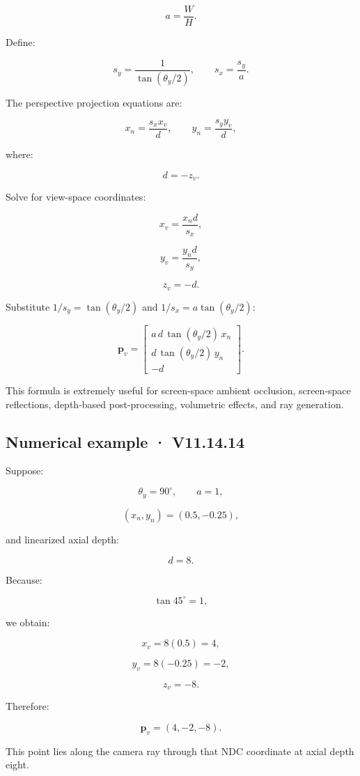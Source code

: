 \[ a=\frac WH. \]

Define:

\[ s_y=\frac1{\tan(\theta_y/2)}, \qquad s_x=\frac{s_y}{a}. \]

The perspective projection equations are:

\[ x_n=\frac{s_xx_v}{d}, \qquad y_n=\frac{s_yy_v}{d}, \]

where:

\[ d=-z_v. \]

Solve for view-space coordinates:

\[ x_v=\frac{x_nd}{s_x}, \]

\[ y_v=\frac{y_nd}{s_y}, \]

\[ z_v=-d. \]

Substitute \(1/s_y=\tan(\theta_y/2)\) and \(1/s_x=a\tan(\theta_y/2)\):

\[ \boxed{ \mathbf p_v= \begin{bmatrix} a\,d\,\tan(\theta_y/2)\,x_n\\ d\,\tan(\theta_y/2)\,y_n\\ -d \end{bmatrix}. } \]

This formula is extremely useful for screen-space ambient occlusion, screen-space reflections, depth-based post-processing, volumetric effects, and ray generation.

\subsection{Numerical example · V11.14.14}\label{02-foundations-ii-ch035-numerical-example-v11.14.14}

Suppose:

\[ \theta_y=90^\circ,\qquad a=1, \]

\[ (x_n,y_n)=(0.5,-0.25), \]

and linearized axial depth:

\[ d=8. \]

Because:

\[ \tan45^\circ=1, \]

we obtain:

\[ x_v=8(0.5)=4, \]

\[ y_v=8(-0.25)=-2, \]

\[ z_v=-8. \]

Therefore:

\[ \boxed{\mathbf p_v=(4,-2,-8)}. \]

This point lies along the camera ray through that NDC coordinate at axial depth eight.

